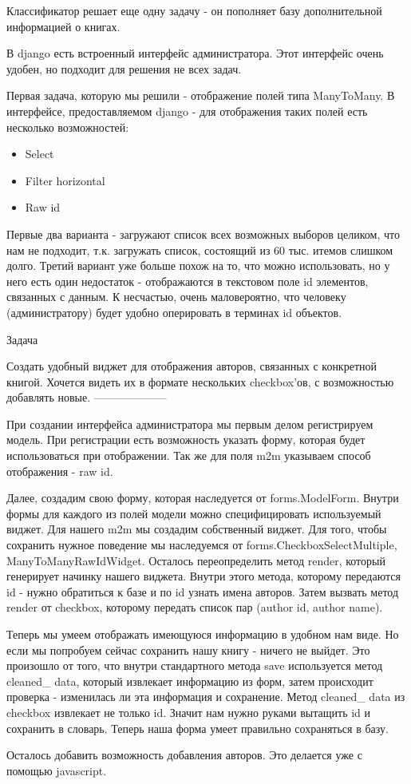 \documentclass[a4paper]{report}
\begin{document}
Классификатор решает еще одну задачу - он пополняет базу дополнительной информацией о книгах.



В django есть встроенный интерфейс администратора. Этот интерфейс очень удобен, но
подходит для решения не всех задач. 

Первая задача, которую мы решили - отображение полей типа ManyToMany. В 
интерфейсе, предоставляемом django - для отображения таких полей есть несколько 
возможностей:
\begin{itemize}
\item Select
\item Filter horizontal
\item Raw id
\end{itemize}
Первые два варианта - загружают список всех возможных выборов целиком, что нам 
не подходит, т.к. загружать список, состоящий из 60 тыс. итемов слишком долго.
Третий вариант уже больше похож  на то, что можно использовать, но у него есть
один недостаток - отображаются в текстовом поле id элементов, связанных с данным.
К несчастью, очень маловероятно, что человеку (администратору) будет удобно 
оперировать в терминах id объектов.

Задача

Создать удобный виджет для отображения авторов, связанных с конкретной книгой.
Хочется видеть их в формате нескольких checkbox'ов, с возможностью добавлять
новые.
--------------------

При создании интерфейса администратора мы первым делом регистрируем модель. При 
регистрации есть возможность указать форму, которая будет использоваться при
отображении. Так же для поля m2m указываем способ отображения - raw id.

Далее, создадим свою форму, которая наследуется от forms.ModelForm.
Внутри формы для каждого из полей модели можно специфицировать используемый 
виджет. Для нашего m2m мы создадим собственный виджет. Для того, чтобы сохранить 
нужное поведение мы наследуемся от forms.CheckboxSelectMultiple, 
ManyToManyRawIdWidget. Осталось переопределить метод render, который генерирует 
начинку нашего виджета. Внутри этого метода, которому передаются id - нужно
обратиться к  базе и по id узнать имена авторов. Затем вызвать метод render
от checkbox, которому передать список пар (author id, author name).

Теперь мы умеем отображать имеющуюся информацию в удобном нам виде. Но если мы 
попробуем сейчас сохранить нашу книгу - ничего не выйдет. Это произошло от того, 
что внутри стандартного метода save используется метод cleaned\_ data, который 
извлекает информацию из форм, затем происходит проверка - изменилась ли эта 
информация и сохранение. Метод cleaned\_ data из checkbox извлекает не только id.
Значит нам нужно руками вытащить id и сохранить в словарь. Теперь наша форма
умеет правильно сохраняться в базу.

Осталось добавить возможность добавления авторов. Это делается уже с помощью 
javascript. 

 
\end{document}
